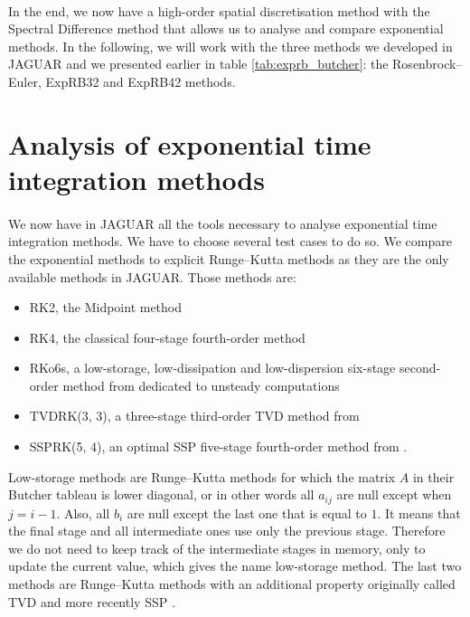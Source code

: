     \paragraph{}
    In the end, we now have a high-order spatial discretisation method with the Spectral Difference method that allows us to analyse and compare exponential methods.
    In the following, we will work with the three methods we developed in JAGUAR and we presented earlier in table \ref{tab:exprb_butcher}: the Rosenbrock--Euler, ExpRB32 and ExpRB42 methods.


  \section{Analysis of exponential time integration methods}

    \paragraph{}
    We now have in JAGUAR all the tools necessary to analyse exponential time integration methods.
    We have to choose several test cases to do so.
    We compare the exponential methods to explicit Runge--Kutta methods as they are the only available methods in JAGUAR.
    Those methods are:
    \begin{itemize}
      \item RK2, the Midpoint method
      \item RK4, the classical four-stage fourth-order method
      \item RKo6s, a low-storage, low-dissipation and low-dispersion six-stage second-order method from \cite{BogeyBailly2004} dedicated to unsteady computations
      \item TVDRK(3, 3), a three-stage third-order TVD method from \cite{ShuOsher1988, GottliebShu1996}
      \item SSPRK(5, 4), an optimal SSP five-stage fourth-order method from \cite{SpiteriRuuth2002}.
    \end{itemize}
    Low-storage methods are Runge--Kutta methods for which the matrix $A$ in their Butcher tableau is lower diagonal, or in other words all $a_{ij}$ are null except when $j = i - 1$.
    Also, all $b_i$ are null except the last one that is equal to $1$.
    It means that the final stage and all intermediate ones use only the previous stage.
    Therefore we do not need to keep track of the intermediate stages in memory, only to update the current value, which gives the name low-storage method.
    The last two methods are Runge--Kutta methods with an additional property originally called TVD \cite{GottliebShu1996} and more recently SSP  \cite{GottliebShuTadmor2001}.
